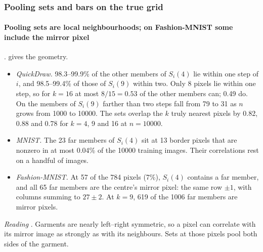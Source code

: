 \subsubsection{Pooling sets and bars on the true grid}\label{sec:interp-img-geom}

\begin{table}[tbp]
\centering{\footnotesize\setlength{\tabcolsep}{3.6pt}
}
\caption{The pooling sets and bars of v3's image members on the true pixel grid (seed 0) . Pooling sets: the fraction of the $k-1$ members of $S_i(k)$ other than $i$ itself that lie within 1 or 2 Chebyshev steps of $i$, over all non-constant pixels $i$; ``$>2$ steps'': the number of such members (of 5408 on QuickDraw at $k=9$). Isomap $R^2$: Procrustes $R^2$ between a 2-D Isomap embedding of the pooling-set graph (an edge from $i$ to each member of $S_i(k)$; ``mutual'': only edges in both directions) and the true pixel coordinates. Bars: the fraction of bars of half-length $L$ whose pixels lie on one horizontal, vertical or diagonal lattice line. MNIST's $k=9$ mutual graph covers 674 of its 682 non-constant pixels. Source: the analysis files in .}
\label{tab:interp-img-geom}
\end{table}

\paragraph{Pooling sets are local neighbourhoods; on Fashion-MNIST some include the mirror pixel} .  gives the geometry.
\begin{itemize}
\item \emph{QuickDraw.} 98.3--99.9\% of the other members of $S_i(4)$ lie within one step of $i$, and 98.5--99.4\% of those of $S_i(9)$ within two. Only 8 pixels lie within one step, so for $k=16$ at most $8/15=0.53$ of the other members can; 0.49 do. On  the members of $S_i(9)$ farther than two steps fall from 79 to 31 as $n$ grows from 1000 to 10000. The sets overlap the $k$ truly nearest pixels by 0.82, 0.88 and 0.78 for $k=4$, 9 and 16 at $n=10000$.
\item \emph{MNIST.} The 23 far members of $S_i(4)$ sit at 13 border pixels that are nonzero in at most 0.04\% of the 10000 training images. Their correlations rest on a handful of images.
\item \emph{Fashion-MNIST.} At 57 of the 784 pixels (7\%), $S_i(4)$ contains a far member, and all 65 far members are the centre's mirror pixel: the same row $\pm1$, with columns summing to $27\pm2$. At $k=9$, 619 of the 1006 far members are mirror pixels.
\end{itemize}
\emph{Reading} . Garments are nearly left--right symmetric, so a pixel can correlate with its mirror image as strongly as with its neighbours. Sets at those pixels pool both sides of the garment.

